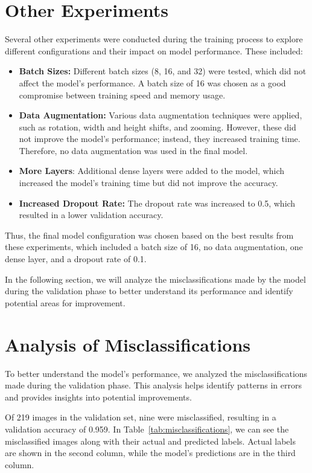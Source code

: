 \section{Other Experiments}

Several other experiments were conducted during the training process to explore different configurations and their impact on model performance. These included:

\begin{itemize}
    \item \textbf{Batch Sizes:} Different batch sizes (8, 16, and 32) were tested, which did not affect the model's performance. A batch size of 16 was chosen as a good compromise between training speed and memory usage.
    \item \textbf{Data Augmentation:} Various data augmentation techniques were applied, such as rotation, width and height shifts, and zooming. However, these did not improve the model's performance; instead, they increased training time. Therefore, no data augmentation was used in the final model.
    \item \textbf{More Layers}: Additional dense layers were added to the model, which increased the model's training time but did not improve the accuracy.
    \item \textbf{Increased Dropout Rate:} The dropout rate was increased to 0.5, which resulted in a lower validation accuracy.
\end{itemize}

Thus, the final model configuration was chosen based on the best results from these experiments, which included a batch size of 16, no data augmentation, one dense layer, and a dropout rate of 0.1.

In the following section, we will analyze the misclassifications made by the model during the validation phase to better understand its performance and identify potential areas for improvement.

\section{Analysis of Misclassifications}

To better understand the model's performance, we analyzed the misclassifications made during the validation phase. This analysis helps identify patterns in errors and provides insights into potential improvements.

Of 219 images in the validation set, nine were misclassified, resulting in a validation accuracy of 0.959. In Table~\ref{tab:misclassifications}, we can see the misclassified images along with their actual and predicted labels. Actual labels are shown in the second column, while the model's predictions are in the third column.

